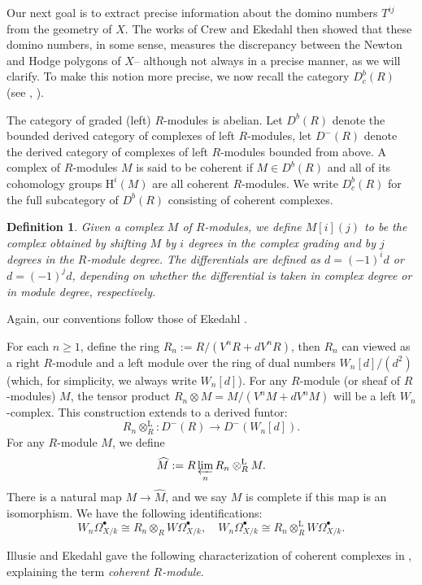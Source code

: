\documentclass[a4paper,12pt,twoside]{report}
\newtheorem{definition}[theorem]{Definition}
\newcommand{\HH}{\mathrm{H}}
\newcommand{\Ld}{\mathrm{L}}
\begin{document}
\medskip

Our next goal is to extract precise information about the domino numbers $T^{ij}$ 
from the geometry of $X$. The works of Crew and Ekedahl then showed that these domino numbers, 
in some sense, 
measures the discrepancy between the Newton and Hodge polygons of $X$--
although not always in a precise manner, 
as we will clarify. To make this notion more precise, we now recall the category \( D^b_c(R) \) (see \cite{I2}, \cite{Ek3}).

The category of graded (left) $R$-modules is abelian. 
Let $D^b(R)$ denote the bounded derived category of complexes of left $R$-modules, 
let $D^-(R)$ denote the derived category of complexes of left $R$-modules bounded from above. 
A complex of $R$-modules $M$ is said to be coherent if $M\in D^b(R)$ 
and all of its cohomology groups $\HH^i(M)$ are all coherent $R$-modules. 
We write $D_c^b(R)$ for the full subcategory of $D^b(R)$ consisting of coherent complexes.

\begin{definition}\label{shifting}
Given a complex $M$ of $R$-modules, we define $M[i](j)$ to be the complex obtained by shifting $M$ by $i$ degrees
in the complex grading and by $j$ degrees in the $R$-module degree. 
The differentials are defined as $d=(-1)^id$ or $d=(-1)^jd$, depending on whether the differential is 
taken in complex degree or in module degree, respectively.
\end{definition} 

Again, our conventions follow those of Ekedahl \cite{Ek1,Ek2,Ek3}. 

For each $n\geqslant 1$, define the ring $R_n:=R/(V^nR+dV^nR)$, 
then $R_n$ can viewed as a right $R$-module and a left module over the ring of dual numbers $W_n[d]/(d^2)$ 
(which, for simplicity, we always write $W_n[d]$). 
For any $R$-module (or sheaf of $R$-modules) $M$, the tensor product 
$R_n\otimes M=M/(V^nM+dV^nM)$ will be a left $W_n$-complex. 
This construction extends to a derived funtor: 
\[R_n\otimes^{\Ld}_R: D^-(R)\rightarrow D^-(W_n[d]).\]
For any $R$-module $M$, we define \[\widehat{M}:=R\varprojlim_n R_n\otimes^{\Ld}_R M.\]
There is a natural map $M\rightarrow \widehat{M}$, and we say $M$ is complete if this map is an isomorphism. 
We have the following identifications: 
\[W_n\Omega^\bullet_{X/k}\cong R_n\otimes_R W\Omega^\bullet_{X/k},\quad W_n\Omega^\bullet_{X/k}\cong R_n\otimes^{\Ld}_R W\Omega^\bullet_{X/k}.\]

Illusie and Ekedahl gave the following characterization of coherent complexes 
in \cite[Proposition 2.4.7]{I2}, explaining the term \emph{coherent $R$-module}. 
\end{document}

